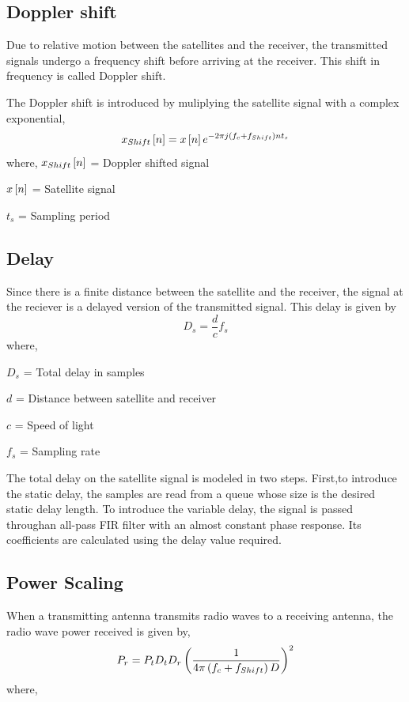 \documentclass[conference]{IEEEtran}
\begin{document}
\subsection{Doppler shift}
Due to relative motion between the satellites and the receiver, the transmitted signals undergo a 
frequency shift before arriving at the receiver. This shift in frequency is called Doppler shift.

The Doppler shift is introduced by muliplying the satellite signal with a complex exponential,
\begin{equation}
    x_{Shift}{}\left[n\right] = x{}\left[n\right]e^{-2 \pi j \left(f_{c}+f_{Shift}\right) n t_{s}}
\end{equation}
where,
$x_{Shift}{}\left[n\right]$ = Doppler shifted signal

$x{}\left[n\right]$ = Satellite signal

$t_{s}$ = Sampling period
\subsection{Delay}
Since there is a finite distance between the satellite and the receiver, the signal at the reciever is a delayed version of the transmitted signal. This delay is given by
\begin{equation}
    D_{s} = \frac{d}{c}f_{s} 
\end{equation}
where,

$D_{s}$ = Total delay in samples

$d$ = Distance between satellite and receiver

$c$ = Speed of light

$f_{s}$ = Sampling rate

The total delay on the satellite signal is modeled in two steps. First,to introduce the static delay,
the samples are read from a queue whose size is the desired static delay length. To introduce the 
variable delay, the signal is passed throughan all-pass FIR filter with an almost constant phase 
response. Its coefficients are calculated using the delay value required.

\subsection{Power Scaling}
When a transmitting antenna transmits radio waves to a receiving antenna, the radio wave power 
received is given by,
\begin{equation}
    P_r = P_t D_t D_r \left(\frac{1}{4 \pi \left(f_c + f_{Shift}\right) D}\right)^2
\end{equation}
where,
\end{document}
